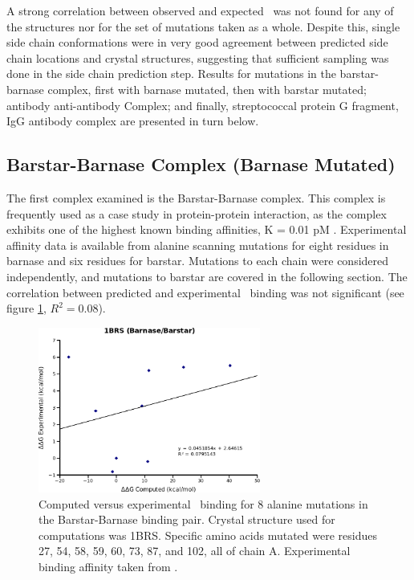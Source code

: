 A strong correlation between observed and expected \ddg\ was not found for any of the structures nor for the set of mutations taken as a whole.
Despite this, single side chain conformations were in very good agreement between predicted side chain locations and crystal structures, suggesting that sufficient sampling was done in the side chain prediction step.
Results for mutations in the barstar-barnase complex, first with barnase mutated, then with barstar mutated; antibody anti-antibody Complex; and finally, streptococcal protein G fragment, IgG antibody complex are presented in turn below.

\FloatBarrier
\subsection{Barstar-Barnase Complex (Barnase Mutated)}
The first complex examined is the Barstar-Barnase complex.
This complex is frequently used as a case study in protein-protein interaction, as the complex exhibits one of the highest known binding affinities, K = 0.01 pM \cite{hartley1988barnase,hartley1989barnase,schreiber1993interaction}.
Experimental affinity data is available from alanine scanning mutations for eight residues in barnase and six residues for barstar.
Mutations to each chain were considered independently, and mutations to barstar are covered in the following section.
The correlation between predicted and experimental \ddg\ binding was not significant (see figure \ref{figure:computational_mutation_scanning/1BRSa_ddg}, $R^{2}=0.08$).

\begin{figure}[h]
    \centering
    \includegraphics[width=0.65\textwidth]{figures/1brs_barnase_barstar.png}
    \caption{Computed versus experimental \ddg\ binding for 8 alanine mutations in the Barstar-Barnase binding pair.
    Crystal structure used for computations was 1BRS.
    Specific amino acids mutated were residues 27, 54, 58, 59, 60, 73, 87, and 102, all of chain A.
    Experimental binding affinity taken from \protect\cite{thorn2001asedb}.}
    \label{figure:computational_mutation_scanning/1BRSa_ddg}
\end{figure}

